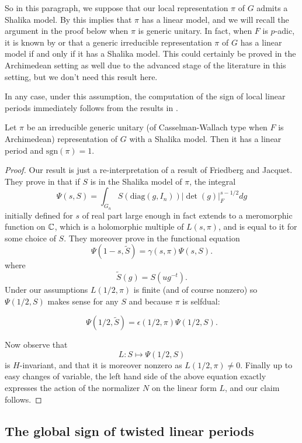 \documentclass[11pt,letterpaper]{amsart}
\def\diag{\mathrm{diag}}
\theoremstyle{plain}
\numberwithin{equation}{section}
\newcommand{\sg}{\mathrm{sgn}}
\begin{document}
So in this paragraph, we suppose that our local representation $\pi$ of $G$ admits a Shalika model. By \cite{JR} this implies that $\pi$ has a linear model, and we will recall the argument in the proof below when $\pi$ is generic unitary. In fact, when $F$ is $p$-adic, it is known by \cite{MatBLMS} or \cite{Gan} that a generic irreducible representation $\pi$ of $G$ has a linear model if and only if it has a Shalika model. This could certainly be proved in the Archimedean setting as well due to the advanced stage of the literature in this setting, but we don't need this result here.

In any case, under this assumption, the computation of the sign of local linear periods immediately follows from the results in \cite{FJ}.

\begin{prop}\label{prop generic linear sign}
Let $\pi$ be an irreducible generic unitary (of Casselman-Wallach type when $F$ is Archimedean) representation of $G$ with a Shalika model. Then it has a linear period and 
$\sg(\pi)=1$. 
\end{prop}
\begin{proof}
Our result is just a re-interpretation of a result of Friedberg and Jacquet. They prove in \cite[Proposition 3.1]{FJ} that if $S$ is in the Shalika model of $\pi$, the integral 
\[\Psi(s,S)=\int_{G_n} S(\diag(g,I_n))|\det(g)|_F^{s-1/2}dg\] initially defined for $s$ of real part large enough in fact extends to a meromorphic function on ${\mathbb {C}}$, which is a holomorphic multiple of $L(s,\pi)$, and is equal to it for some choice of $S$. They moreover prove in \cite[Proposition 3.6]{FJ} the functional equation 
\[\Psi(1-s,\widetilde{S})=\gamma(s,\pi)\Psi(s,S).\] where 
\[\widetilde{S}(g)=S(ug^{-t}).\] Under our assumptions $L(1/2,\pi)$ is finite (and of course nonzero) so 
$\Psi(1/2,S)$ makes sense for any $S$ and because $\pi$ is selfdual:

\[\Psi(1/2,\widetilde{S})=\epsilon(1/2,\pi)\Psi(1/2,S).\] 

Now observe that \[L:S\mapsto \Psi(1/2,S)\] is $H$-invariant, and that it is moreover nonzero as $L(1/2,\pi)\neq 0$. 
Finally up to easy changes of variable, the left hand side of the above equation exactly expresses the action of the normalizer $N$ on the linear form $L$, and our claim follows.
\end{proof}

\subsection{The global sign of twisted linear periods}
\end{document}
